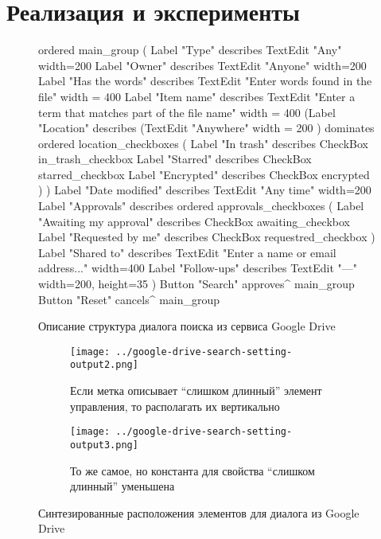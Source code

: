 
\section{Реализация и эксперименты}

\begin{figure*}[t]
\begin{verbnobox}[\fontsize{10pt}{10pt}\selectfont]
ordered main_group (
  Label "Type" describes TextEdit "Any" {width=200}
  Label "Owner" describes TextEdit "Anyone" {width=200}
  Label "Has the words" describes TextEdit "Enter words found in the file" {
   width = 400
  }
  Label "Item name" describes
    TextEdit "Enter a term that matches part of the file name" {
      width = 400
    }
  (Label "Location" describes
    (TextEdit "Anywhere" { width = 200 }) dominates
    ordered location_checkboxes (
      Label "In trash"  describes CheckBox in_trash_checkbox
      Label "Starred"   describes CheckBox starred_checkbox
      Label "Encrypted" describes CheckBox encrypted
    )
  )
  Label "Date modified" describes  TextEdit "Any time" {width=200}
  Label "Approvals" describes
    ordered approvals_checkboxes (
      Label "Awaiting my approval" describes CheckBox awaiting_checkbox
      Label "Requested by me" describes CheckBox requestred_checkbox
  )
  Label "Shared to" describes
    TextEdit "Enter a name or email address..." {width=400}
  Label "Follow-ups" describes TextEdit "---" {width=200, height=35}
)
Button "Search" approves^ main_group
Button "Reset" cancels^ main_group
\end{verbnobox}
\caption{Описание структура диалога поиска из сервиса Google Drive}
\label{gd_structure}
\end{figure*}

\begin{figure*}[t]
    \begin{subfigure}[t]{.45\textwidth}
        \vspace{-15em}
        \begin{minipage}{4cm}
        \texttt{[image: ../google-drive-search-setting-output2.png]}
        \end{minipage}
        \caption{Если метка описывает \enquote{слишком длинный} элемент управления, то располагать их вертикально}
    \end{subfigure}\hspace{1cm}
    \begin{subfigure}[t]{.45\textwidth}
      \texttt{[image: ../google-drive-search-setting-output3.png]}
      \caption{То же самое, но константа для свойства  \enquote{слишком длинный} уменьшена}
    \end{subfigure}
    \caption{Синтезированные расположения элементов для диалога из Google Drive}
    \label{fig:QMLtwoGuidelines}
\end{figure*}



